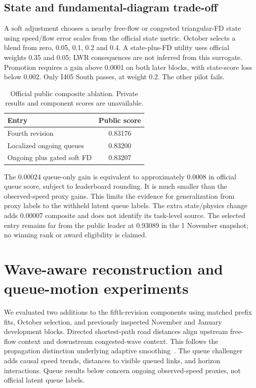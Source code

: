 \documentclass[conference]{IEEEtran}
\begin{document}
\subsection{State and fundamental-diagram trade-off}
A soft adjustment chooses a nearby free-flow or congested triangular-FD state
using speed/flow error scales from the official state metric. October selects
a blend from zero, 0.05, 0.1, 0.2 and 0.4. A state-plus-FD utility uses official
weights 0.35 and 0.05; LWR consequences are not inferred from this surrogate.
Promotion requires a gain above 0.0001 on both later blocks, with state-score
loss below 0.002. Only I405 South passes, at weight 0.2. The other pilot fails.

\begin{table}[t]\centering
\caption{Official public composite ablation. Private results and component scores are unavailable.}
\begin{tabular}{lc}\hline
Entry & Public score\\\hline
Fourth revision & 0.83176\\
Localized ongoing queues & 0.83200\\
Ongoing plus gated soft FD & 0.83207\\\hline
\end{tabular}\end{table}
The 0.00024 queue-only gain is equivalent to approximately 0.0008 in official
queue score, subject to leaderboard rounding. It is much smaller than the
observed-speed proxy gains. This limits the evidence for generalization from
proxy labels to the withheld latent queue labels. The extra state/physics change
adds 0.00007 composite and does not identify its task-level source. The selected
entry remains far from the public leader at 0.93089 in the 1 November snapshot;
no winning rank or award eligibility is claimed.


\section{Wave-aware reconstruction and queue-motion experiments}
We evaluated two additions to the fifth-revision components using matched
prefix fits, October selection, and previously inspected November and January
development blocks. Directed shortest-path road distances align upstream
free-flow context and downstream congested-wave context. This follows the
propagation distinction underlying adaptive smoothing~\cite{treiber2002}.
The queue challenger adds causal speed trends, distances to visible queued
links, and horizon interactions. Queue results below concern ongoing
observed-speed proxies, not official latent queue labels.
\end{document}
